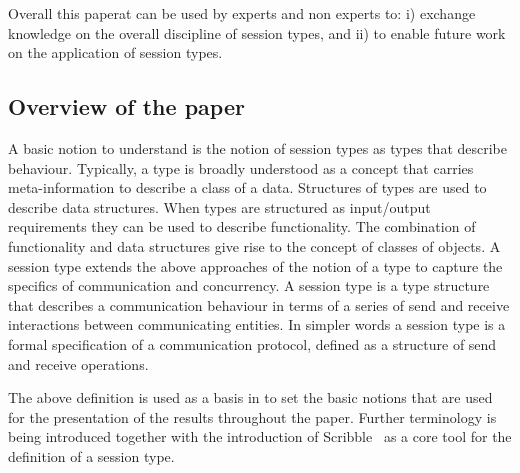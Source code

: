 Overall this paperat can be used by experts and non experts
to: i) exchange knowledge on the overall discipline of session types,
and ii) to enable future work on the application of session types.


\subsection{Overview of the paper}


A basic notion to understand is the notion of session types
as types that describe behaviour.
Typically, a type is broadly understood
as a concept that carries meta-information to describe a class of a data.
Structures of types are used to describe data structures.
When types are structured as input/output requirements they
can be used to describe functionality. The combination of
functionality and data structures give rise to the concept
of classes of objects.
%
A session type extends the above approaches of
the notion of a type to capture the specifics of communication and concurrency.
A session type is a type structure that describes a communication
behaviour in terms of a series of send and receive interactions between
communicating entities.
In simpler words a session type is a formal specification of a
communication protocol, defined as a structure of send and receive
operations.

The above definition is used as a basis in 
to set the basic notions that are used for the presentation of the results
throughout the paper. Further terminology is being introduced together with
the introduction of Scribble~\cite{scribble} as a core tool for the definition
of a session type.


